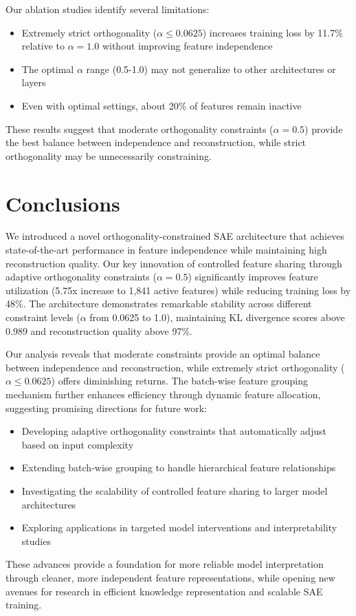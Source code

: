\documentclass{article} %
\begin{document}
Our ablation studies identify several limitations:

\begin{itemize}
\item Extremely strict orthogonality ($\alpha \leq 0.0625$) increases training loss by 11.7\% relative to $\alpha=1.0$ without improving feature independence
\item The optimal $\alpha$ range (0.5-1.0) may not generalize to other architectures or layers
\item Even with optimal settings, about 20\% of features remain inactive
\end{itemize}

These results suggest that moderate orthogonality constraints ($\alpha=0.5$) provide the best balance between independence and reconstruction, while strict orthogonality may be unnecessarily constraining.


\section{Conclusions}
\label{sec:conclusion}

We introduced a novel orthogonality-constrained SAE architecture that achieves state-of-the-art performance in feature independence while maintaining high reconstruction quality. Our key innovation of controlled feature sharing through adaptive orthogonality constraints ($\alpha=0.5$) significantly improves feature utilization (5.75x increase to 1,841 active features) while reducing training loss by 48\%. The architecture demonstrates remarkable stability across different constraint levels ($\alpha$ from 0.0625 to 1.0), maintaining KL divergence scores above 0.989 and reconstruction quality above 97\%.

Our analysis reveals that moderate constraints provide an optimal balance between independence and reconstruction, while extremely strict orthogonality ($\alpha \leq 0.0625$) offers diminishing returns. The batch-wise feature grouping mechanism further enhances efficiency through dynamic feature allocation, suggesting promising directions for future work:

\begin{itemize}
\item Developing adaptive orthogonality constraints that automatically adjust based on input complexity
\item Extending batch-wise grouping to handle hierarchical feature relationships
\item Investigating the scalability of controlled feature sharing to larger model architectures
\item Exploring applications in targeted model interventions and interpretability studies
\end{itemize}

These advances provide a foundation for more reliable model interpretation through cleaner, more independent feature representations, while opening new avenues for research in efficient knowledge representation and scalable SAE training.



\end{document}
